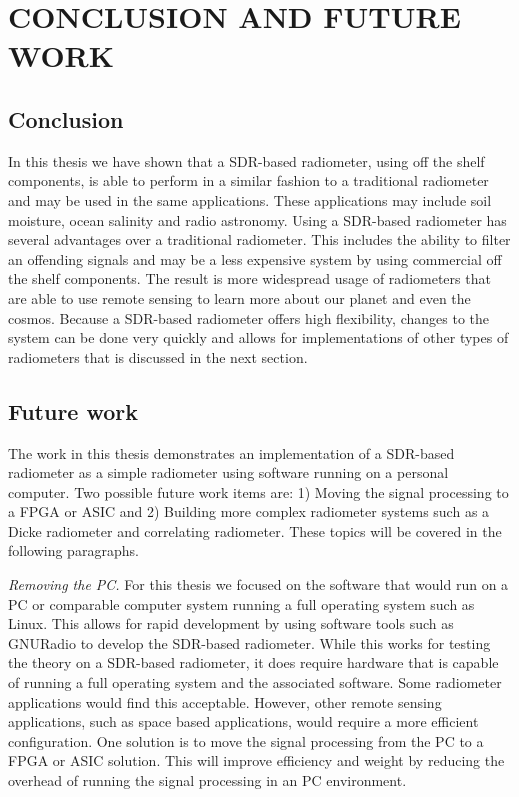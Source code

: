 
\chapter{CONCLUSION AND FUTURE WORK} \label{ch:conclusion}

\section{Conclusion}
In this thesis we have shown that a SDR-based radiometer, using off the shelf components, is able to perform in a similar fashion to a traditional radiometer and may be used in the same applications. These applications may include soil moisture, ocean salinity and radio astronomy.   Using a SDR-based radiometer has several advantages over a traditional radiometer.  This includes the ability to filter an offending signals and may be a less expensive system by using commercial off the shelf components. The result is more widespread usage of radiometers that are able to use remote sensing to learn more about our planet and even the cosmos. Because a SDR-based radiometer offers high flexibility, changes to the system can be done very quickly and allows for implementations of other types of radiometers that is discussed in the next section.

\section{Future work}\label{Futurework}

The work in this thesis demonstrates an implementation of a SDR-based radiometer as a simple radiometer using software running on a personal computer.  Two possible future work items are: 1) Moving the signal processing to a FPGA or ASIC and 2) Building more complex radiometer systems such as a Dicke radiometer and correlating radiometer.  These topics will be covered in the following paragraphs.   

\emph{Removing the PC.}  For this thesis we focused on the software that would run on a PC or comparable computer system running a full operating system such as Linux.  This allows for rapid development by using software tools such as GNURadio to develop the SDR-based radiometer.  While this works for testing the theory on a SDR-based radiometer, it does require hardware that is capable of running a full operating system and the associated software.  Some radiometer applications would find this acceptable.  However, other remote sensing applications, such as space based applications, would require a more efficient configuration.  One solution is to move the signal processing from the PC to a FPGA or ASIC solution.  This will improve efficiency and weight by reducing the overhead of running the signal processing in an PC environment. 

